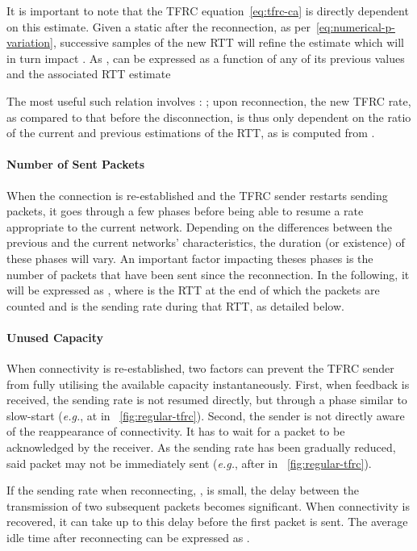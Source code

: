 \documentclass[twocolumn]{nictatechreport}
\newcommand{\latinlocution}[1]{\textit{#1}}
\newcommand{\eg}{\latinlocution{e.g.}}
\begin{document}
It is important to note that the TFRC equation~\eqref{eq:tfrc-ca} is directly
dependent on this estimate. Given a static  after the reconnection, as
per~\eqref{eq:numerical-p-variation}, successive samples of the new RTT will
refine the estimate which will in turn impact . As
,  can be expressed as a function of any of
its previous values  and the associated RTT estimate 

The most useful such relation involves :
; upon reconnection, the new
TFRC rate, as compared to that before the disconnection, is thus only
dependent on the ratio of the current and previous estimations of the RTT, as
 is computed from .

\paragraph{Number of Sent Packets}

When the connection is re-established and the TFRC sender restarts sending
packets, it goes through a few phases before being able to resume a rate
appropriate to the current network. Depending on the differences between the
previous and the current networks' characteristics, the duration (or existence)
of these phases will vary. An important factor impacting theses phases is the
number of packets that have been sent since the reconnection. In the following,
it will be expressed as
,
where  is the RTT at the end of which the packets are counted and 
is the sending rate during that RTT, as detailed below.

\paragraph{Unused Capacity}

When connectivity is re-established, two factors can prevent the TFRC sender
from fully utilising the available capacity instantaneously.  First, when
feedback is received, the sending rate is not resumed directly, but through a
phase similar to slow-start (\eg, at  in
\figurename~\ref{fig:regular-tfrc}).  Second, the sender is not directly aware
of the reappearance of connectivity. It has to wait for a packet to be
acknowledged by the receiver. As the sending rate has been gradually reduced,
said packet may not be immediately sent (\eg,  after
 in \figurename~\ref{fig:regular-tfrc}). 

If the sending rate when reconnecting, , is small, the delay
 between the transmission of two subsequent packets becomes significant.
When connectivity is recovered, it can take up to this delay before the first
packet is sent. The average idle time after reconnecting can be expressed as
.
\end{document}
